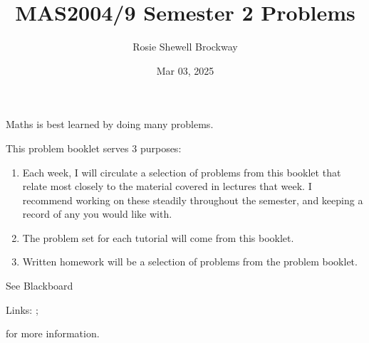 \documentclass[letterpaper,10pt,english]{jupyterBook}
\title{MAS2004/9 Semester 2 Problems}
\date{Mar 03, 2025}
\author{Rosie Shewell Brockway}
\begin{document}
\pagestyle{empty}
\sphinxmaketitle
\pagestyle{plain}
\sphinxtableofcontents
\pagestyle{normal}
\label{\detokenize{intro::doc}}


\sphinxAtStartPar
Maths is best learned by doing many problems.

\sphinxAtStartPar
This problem booklet serves 3 purposes:

\label{\detokenize{intro:pow}}\begin{enumerate}
%
\item {} 
\sphinxAtStartPar
{} 
Each week, I will circulate a selection of problems from this booklet that relate most closely to the material covered in lectures that week. I recommend working on these steadily throughout the semester, and keeping a record of any you would like  with.

\item {} 
\sphinxAtStartPar
{} 
The problem set for each tutorial will come from this booklet.

\item {} 
\sphinxAtStartPar
{} 
Written homework will be a selection of problems from the problem booklet. 

\end{enumerate}

\sphinxAtStartPar
See Blackboard%
\begin{footnote}[1]\sphinxAtStartFootnote
Links: ; 
%
\end{footnote} for more information.



\begin{DUlineblock}{0em}
\item[] 
\end{DUlineblock}

\sphinxAtStartPar
{\hyperref[\detokenize{Problems:prob}]{}} 
  {\hyperref[\detokenize{Problems:ch1prob}]{}} 
  {\hyperref[\detokenize{Problems:ch2prob}]{}} 
  {\hyperref[\detokenize{Problems:ch3prob}]{}} 
  {\hyperref[\detokenize{Problems:ch4prob}]{}} 
  {\hyperref[\detokenize{Problems:ch5prob}]{}} 
  {\hyperref[\detokenize{Problems:ch6prob}]{}}
\end{document}
